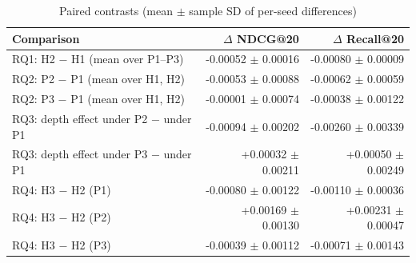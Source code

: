 \begin{table}[H]
\centering
\small
\begin{tabular}{lrr}
\toprule
Comparison & $\Delta$ NDCG@20 & $\Delta$ Recall@20 \\
\midrule
RQ1: H2 $-$ H1 (mean over P1--P3) & -0.00052 $\pm$ 0.00016 & -0.00080 $\pm$ 0.00009 \\
RQ2: P2 $-$ P1 (mean over H1, H2) & -0.00053 $\pm$ 0.00088 & -0.00062 $\pm$ 0.00059 \\
RQ2: P3 $-$ P1 (mean over H1, H2) & -0.00001 $\pm$ 0.00074 & -0.00038 $\pm$ 0.00122 \\
RQ3: depth effect under P2 $-$ under P1 & -0.00094 $\pm$ 0.00202 & -0.00260 $\pm$ 0.00339 \\
RQ3: depth effect under P3 $-$ under P1 & +0.00032 $\pm$ 0.00211 & +0.00050 $\pm$ 0.00249 \\
RQ4: H3 $-$ H2 (P1) & -0.00080 $\pm$ 0.00122 & -0.00110 $\pm$ 0.00036 \\
RQ4: H3 $-$ H2 (P2) & +0.00169 $\pm$ 0.00130 & +0.00231 $\pm$ 0.00047 \\
RQ4: H3 $-$ H2 (P3) & -0.00039 $\pm$ 0.00112 & -0.00071 $\pm$ 0.00143 \\
\bottomrule
\end{tabular}
\caption{Paired contrasts (mean $\pm$ sample SD of per-seed differences)\RunTag}
\label{tab:contrasts}
\end{table}
